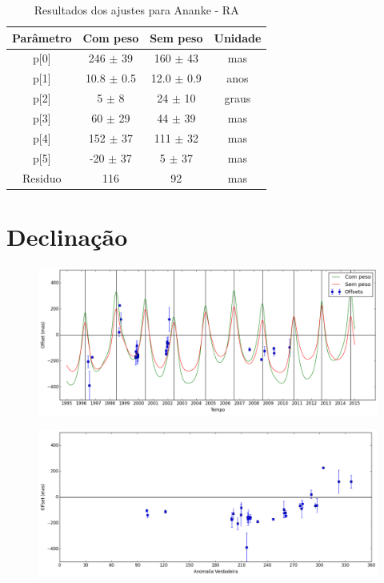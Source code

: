 \documentclass[11pt,a4paper]{report}
\begin{document}
\begin{table}[h!]
\caption{\label{Tab: Ananke-RA} Resultados dos ajustes para Ananke - RA}
\begin{centering}
\begin{tabular}{cccc}
\hline
\hline
Parâmetro & Com peso & Sem peso & Unidade\tabularnewline
\hline
p[0] & 246 $\pm$ 39 & 160 $\pm$ 43 & mas\\
p[1] & 10.8 $\pm$ 0.5 & 12.0 $\pm$ 0.9 & anos\\
p[2] & 5 $\pm$ 8 & 24 $\pm$ 10 & graus\\
p[3] & 60 $\pm$ 29 & 44 $\pm$ 39 & mas\\
p[4] & 152 $\pm$ 37 & 111 $\pm$ 32 & mas\\
p[5] & -20 $\pm$ 37 & 5 $\pm$ 37 & mas\\
Residuo & 116 & 92 & mas\\
\hline 
\end{tabular} 
\par\end{centering}
\end{table}

\section*{Declinação}


\begin{figure}[h]
\begin{centering}
\includegraphics[scale=0.45]{Ananke/DEC.png}
\end{centering}
\end{figure}

\begin{figure}[h]
\includegraphics[scale=0.45]{Ananke/DEC_anom.png}  
\end{figure}
\end{document}
